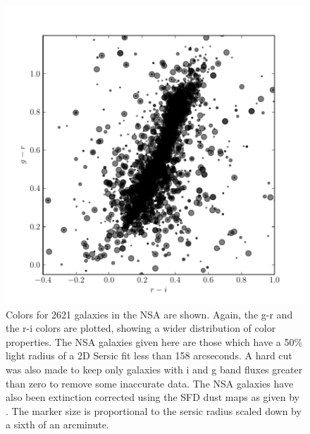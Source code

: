 \documentclass[12pt,preprint,pdftex]{aastex}
\begin{document}
\begin{figure}
\centering
\includegraphics[trim=0mm 0mm 0mm 10mm, clip=true]{nsa_colors.pdf}
\caption{Colors for 2621 galaxies in the NSA are shown. Again, the g-r and the r-i colors are plotted, showing a wider distribution of color properties. The NSA galaxies given here are those which have a 50\% light radius of a 2D Sersic fit less than 158 arcseconds. A hard cut was also made to keep only galaxies with i and g band fluxes greater than zero to remove some inaccurate data. The NSA galaxies have also been extinction corrected using the SFD dust maps as given by \cite{blanton11}. The marker size is proportional to the sersic radius scaled down by a sixth of an arcminute.}
\label{fig:nsacolors}
\end{figure}
\end{document}
